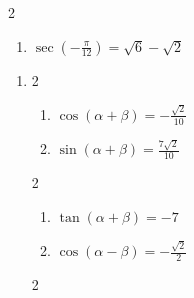 \documentclass{ximera}
\begin{document}
\begin{multicols}{2}

\begin{enumerate}

\setcounter{enumi}{\value{HW}}

\item $\sec \left( -\frac{\pi}{12} \right) = \sqrt{6} - \sqrt{2}$

\setcounter{HW}{\value{enumi}}

\end{enumerate}

\end{multicols}

\begin{enumerate}

\setcounter{enumi}{\value{HW}}

\item \begin{multicols}{2}

\begin{enumerate}

\item  $\cos(\alpha + \beta) = -\frac{\sqrt{2}}{10}$
\item  $\sin(\alpha + \beta) = \frac{7\sqrt{2}}{10}$

\setcounter{HWindent}{\value{enumii}}

\end{enumerate}

\end{multicols}

\begin{multicols}{2}

\begin{enumerate}

\setcounter{enumii}{\value{HWindent}}

\item  $\tan(\alpha + \beta) = -7$ 
\item  $\cos(\alpha - \beta)= -\frac{\sqrt{2}}{2}$

\setcounter{HWindent}{\value{enumii}}

\end{enumerate}

\end{multicols}

\begin{multicols}{2}

\begin{enumerate}

\setcounter{enumii}{\value{HWindent}}


\end{enumerate}
\end{multicols}
\end{enumerate}
\end{document}
